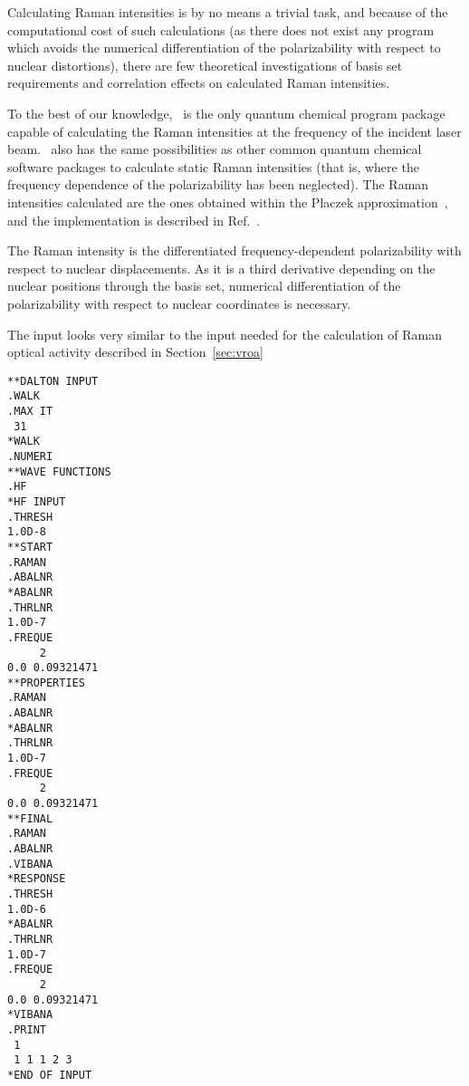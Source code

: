 \begin{center}
\end{center}

 Calculating Raman intensities is by no means
a trivial task, and
because of the computational cost of such calculations (as there does
not exist any program which avoids the numerical differentiation of the
polarizability with respect to nuclear distortions), there are
few theoretical investigations of basis set requirements and
correlation effects on calculated Raman intensities.

To the best of our knowledge, \siraba\ is the only quantum chemical program package capable of
calculating the Raman intensities at the frequency of the incident
laser beam. \siraba\ also has the same possibilities as other
common quantum chemical software packages to calculate static
Raman intensities (that is, where the frequency dependence of the
polarizability has been neglected). The Raman intensities calculated
are the ones obtained within the Placzek
approximation~\cite{placzek},
and the implementation is described in Ref.~\cite{thkrklbpjjofd99}.

The Raman intensity is the differentiated frequency-dependent
polarizability with respect to nuclear displacements.
As it is a third derivative depending on the nuclear positions through
the basis set, numerical differentiation of
the polarizability with respect to nuclear coordinates is
necessary.

The input looks very similar to the input needed for the calculation
of Raman optical activity  described
in Section~\ref{sec:vroa}

\begin{verbatim}
**DALTON INPUT
.WALK
.MAX IT
 31
*WALK
.NUMERI
**WAVE FUNCTIONS
.HF
*HF INPUT
.THRESH
1.0D-8
**START
.RAMAN
.ABALNR
*ABALNR
.THRLNR
1.0D-7
.FREQUE
     2
0.0 0.09321471
**PROPERTIES
.RAMAN
.ABALNR
*ABALNR
.THRLNR
1.0D-7
.FREQUE
     2
0.0 0.09321471
**FINAL
.RAMAN
.ABALNR
.VIBANA
*RESPONSE
.THRESH
1.0D-6
*ABALNR
.THRLNR
1.0D-7
.FREQUE
     2
0.0 0.09321471
*VIBANA
.PRINT
 1
 1 1 1 2 3
*END OF INPUT
\end{verbatim}

